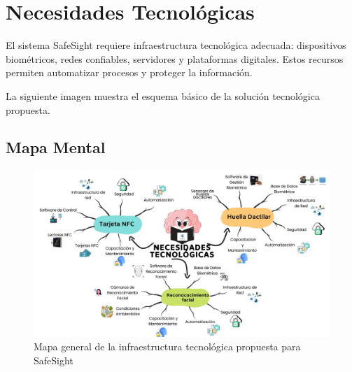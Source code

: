 \section{Necesidades Tecnológicas}

El sistema SafeSight requiere infraestructura tecnológica adecuada: dispositivos biométricos, redes confiables, servidores y plataformas digitales. Estos recursos permiten automatizar procesos y proteger la información.

La siguiente imagen muestra el esquema básico de la solución tecnológica propuesta.
\subsection{Mapa Mental}

\begin{figure}[H]
    \centering
    \includegraphics[width=1.0\textwidth]{./mapa .jpg}
    \caption{Mapa general de la infraestructura tecnológica propuesta para SafeSight}
    \label{fig:infraestructura}
\end{figure}

